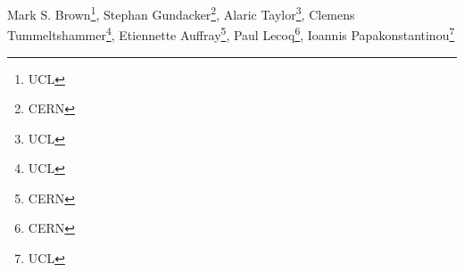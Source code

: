 Mark S. Brown\footnote{UCL}, Stephan Gundacker\footnote{CERN}, Alaric Taylor\footnote{UCL}, Clemens Tummeltshammer\footnote{UCL}, Etiennette Auffray\footnote{CERN}, Paul Lecoq\footnote{CERN}, Ioannis Papakonstantinou\footnote{UCL}
 

